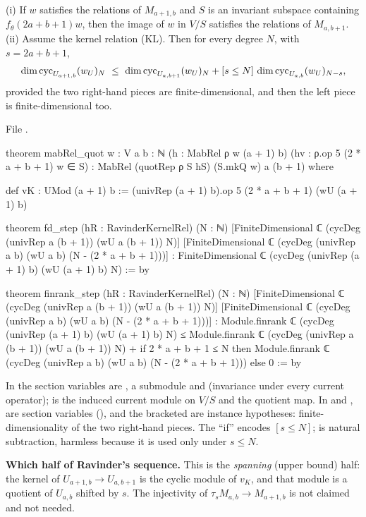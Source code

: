 \begin{theorem}\label{l26:thm:step}
(i) If $w$ satisfies the relations of $M_{a+1,b}$ and $S$ is an invariant subspace containing $f_\theta(2a+b+1)w$, then
the image of $w$ in $V/S$ satisfies the relations of $M_{a,b+1}$. (ii) Assume the kernel relation (KL). Then for every
degree $N$, with $s=2a+b+1$,
\begin{equation*}
\dim\ltwentysixcyc_{U_{a+1,b}}(w_U)_N\ \le\ \dim\ltwentysixcyc_{U_{a,b+1}}(w_U)_N+[s\le N]\,\dim\ltwentysixcyc_{U_{a,b}}(w_U)_{N-s},
\end{equation*}
provided the two right-hand pieces are finite-dimensional, and then the left piece is finite-dimensional too.
\end{theorem}
\noindent File .
\begin{leancode}
theorem mabRel_quot {w : V} {a b : ℕ} (h : MabRel ρ w (a + 1) b)
    (hv : ρ.op 5 (2 * a + b + 1) w ∈ S) : MabRel (quotRep ρ S hS) (S.mkQ w) a (b + 1) where
\end{leancode}
\begin{leancode}
def vK : UMod (a + 1) b := (univRep (a + 1) b).op 5 (2 * a + b + 1) (wU (a + 1) b)

theorem fd_step (hR : RavinderKernelRel) (N : ℕ)
    [FiniteDimensional ℂ (cycDeg (univRep a (b + 1)) (wU a (b + 1)) N)]
    [FiniteDimensional ℂ (cycDeg (univRep a b) (wU a b) (N - (2 * a + b + 1)))] :
    FiniteDimensional ℂ (cycDeg (univRep (a + 1) b) (wU (a + 1) b) N) := by

theorem finrank_step (hR : RavinderKernelRel) (N : ℕ)
    [FiniteDimensional ℂ (cycDeg (univRep a (b + 1)) (wU a (b + 1)) N)]
    [FiniteDimensional ℂ (cycDeg (univRep a b) (wU a b) (N - (2 * a + b + 1)))] :
    Module.finrank ℂ (cycDeg (univRep (a + 1) b) (wU (a + 1) b) N) ≤
      Module.finrank ℂ (cycDeg (univRep a (b + 1)) (wU a (b + 1)) N) +
        if 2 * a + b + 1 ≤ N then
          Module.finrank ℂ (cycDeg (univRep a b) (wU a b) (N - (2 * a + b + 1))) else 0 := by
\end{leancode}

\begin{dictionary}
In  the section variables are , a submodule  and 
(invariance under every current operator);  is the induced current module on $V/S$ and 
the quotient map. In  and ,  are section variables (),
and the bracketed \lean{[FiniteDimensional ...]} are instance hypotheses: finite-dimensionality of the two right-hand
pieces. The ``if'' encodes $[s\le N]$;  is natural subtraction, harmless because it is used
only under $s\le N$.

\textbf{Which half of Ravinder's sequence.} This is the \emph{spanning} (upper bound) half: the kernel of
$U_{a+1,b}\to U_{a,b+1}$ is the cyclic module of $v_K$, and that module is a quotient of $U_{a,b}$ shifted by $s$. The
injectivity of $\tau_sM_{a,b}\to M_{a+1,b}$ is not claimed and not needed.
\end{dictionary}

